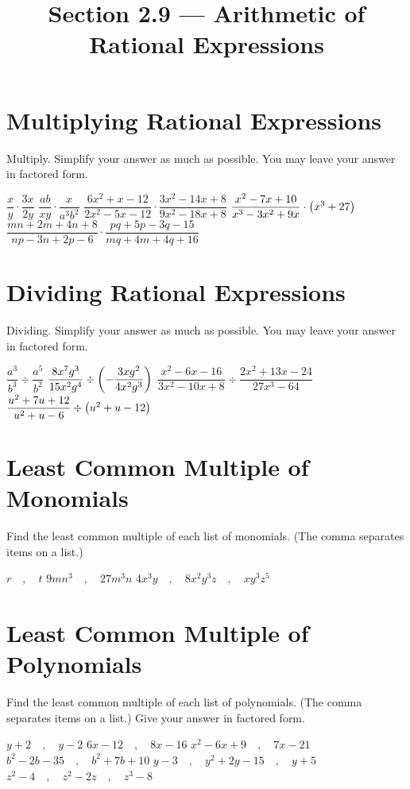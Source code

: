 

\title{Section 2.9 --- Arithmetic of Rational Expressions}


\maketitle
\section*{Multiplying Rational Expressions}
Multiply.  Simplify your answer as much as possible.  You may leave your answer in factored form.
\begin{smenum}
\mitemxxxo
{$\dfrac{x}{y}\cdot\dfrac{3x}{2y}$}
{$\dfrac{ab}{xy}\cdot\dfrac{x}{a^3b^2}$}
{$\dfrac{6x^2+x-12}{2x^2-5x-12}\cdot\dfrac{3x^2-14x+8}{9x^2-18x+8}$}
\mitemxx
{$\dfrac{x^2-7x+10}{x^3-3x^2+9x}\cdot\left(x^3+27\right)$}
{$\dfrac{mn+2m+4n+8}{np-3n+2p-6}\cdot\dfrac{pq+5p-3q-15}{mq+4m+4q+16}$}
\end{smenum}

\section*{Dividing Rational Expressions}
Dividing.  Simplify your answer as much as possible.  You may leave your answer in factored form.
\begin{smenum}
\mitemxx
{$\dfrac{a^3}{b^3}\div\dfrac{a^5}{b^2}$}
{$\dfrac{8x^7g^3}{15x^2g^4}\div\left(-\dfrac{3xg^2}{4x^2g^3}\right)$}
\mitemxx
{$\dfrac{x^2-6x-16}{3x^2-10x+8}\div\dfrac{2x^2+13x-24}{27x^3-64}$}
{$\dfrac{u^2+7u+12}{u^2+u-6}\div\left(u^2+u-12\right)$}
\end{smenum}

\section*{Least Common Multiple of Monomials}
Find the least common multiple of each list of monomials.  (The comma separates items on a list.)
\begin{smenum}
\mitemxxx
{$r \quad,\quad t$}
{$9mn^3 \quad,\quad 27m^3n$}
{$4x^3y \quad,\quad 8x^2y^3z \quad,\quad xy^3z^5$}
\end{smenum}

\section*{Least Common Multiple of Polynomials}
Find the least common multiple of each list of polynomials.  (The comma separates items on a list.)  Give your answer in factored form.
\begin{smenum}
\mitemxx
{$y+2 \quad,\quad y-2$}
{$6x-12 \quad,\quad 8x-16$}
\mitemxx
{$x^2-6x+9 \quad,\quad 7x-21$}
{$b^2-2b-35 \quad,\quad b^2+7b+10$}
\mitemxx
{$y-3 \quad,\quad y^2+2y-15 \quad,\quad y+5$}
{$z^2-4 \quad,\quad z^2-2z \quad,\quad z^3-8$}
\end{smenum}

